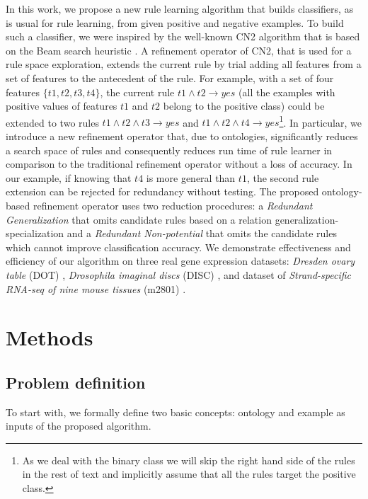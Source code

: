 \documentclass{bmcart}
\begin{document}
In this work, we propose a new rule learning algorithm that builds classifiers, as is usual for rule learning, from given positive and negative examples. To build such a classifier, we were inspired by the well-known CN2 algorithm that is based on the Beam search heuristic \cite{clark1989cn2}. A refinement operator of CN2, that is used for a rule space exploration, extends the current rule by trial adding all features from a set of features to the antecedent of the rule. For example, with a set of four features $\{t1, t2, t3, t4\}$, the current rule $t1 \wedge t2 \rightarrow yes$ (all the examples with positive values of features $t1$ and $t2$ belong to the positive class) could be extended to two rules $t1 \wedge t2 \wedge t3 \rightarrow yes$ and $t1 \wedge t2 \wedge t4 \rightarrow yes$\footnote{As we deal with the binary class we will skip the right hand side of the rules in the rest of text and implicitly assume that all the rules target the positive class.}. In particular, we introduce a new refinement operator that, due to ontologies, significantly reduces a search space of rules and consequently reduces run time of rule learner in comparison to the traditional refinement operator without a loss of accuracy. In our example, if knowing that $t4$ is more general than $t1$, the second rule extension can be rejected for redundancy without testing. The proposed ontology-based refinement operator uses two reduction procedures: a \emph{Redundant Generalization} that omits candidate rules based on a relation generalization-specialization and a \emph{Redundant Non-potential} that omits the candidate rules which cannot improve classification accuracy. We demonstrate effectiveness and efficiency of our algorithm on three real gene expression datasets: \emph{Dresden ovary table} (DOT) \cite{jambor2015systematic,dot}, \emph{Drosophila imaginal discs} (DISC) \cite{borovec2016binary}, and dataset of \emph{Strand-specific RNA-seq of nine mouse tissues} (m2801) \cite{merkin2012evolutionary}.


\section*{Methods}
\subsection*{Problem definition}\label{section:problemdef}
To start with, we formally define two basic concepts: ontology and example as inputs of the proposed algorithm. 
\end{document}

